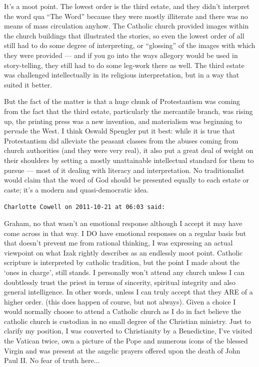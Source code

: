 \begin{footnotesize}
\begin{sffamily}
It's a moot point. The lowest order is the third estate, and they didn't interpret the word qua ``The Word'' because they were mostly illiterate and there was no means of mass circulation anyhow. The Catholic church provided images within the church buildings that illustrated the stories, so even the lowest order of all still had to do some degree of interpreting, or ``glossing'' of the images with which they were provided --- and if you go into the ways allegory would be used in story-telling, they still had to do some leg-work there as well. The third estate was challenged intellectually in its religious interpretation, but in a way that suited it better.

But the fact of the matter is that a huge chunk of Protestantism was coming from the fact that the third estate, particularly the mercantile branch, was rising up, the printing press was a new invention, and materialism was beginning to pervade the West. I think Oswald Spengler put it best: while it is true that Protestantism did alleviate the peasant classes from the abuses coming from church authorities (and they were very real), it also put a great deal of weight on their shoulders by setting a mostly unattainable intellectual standard for them to pursue --- most of it dealing with literacy and interpretation. No traditionalist would claim that the word of God should be presented equally to each estate or caste; it's a modern and quasi-democratic idea.

\hfill

\texttt{Charlotte Cowell on 2011-10-21 at 06:03 said:}

Graham, no that wasn't an emotional response although I accept it may have come across in that way. I DO have emotional responses on a regular basis but that doesn't prevent me from rational thinking, I was expressing an actual viewpoint on what Izak rightly describes as an endlessly moot point. Catholic scripture is interpreted by catholic tradition, but the point I made about the `ones in charge', still stands. I personally won't attend any church unless I can doubtlessly trust the priest in terms of sincerity, spiritual integrity and also general intelligence. In other words, unless I can truly accept that they ARE of a higher order. (this does happen of course, but not always). Given a choice I would normally choose to attend a Catholic church as I do in fact believe the catholic church is custodian in no small degree of the Christian ministry. Just to clarify my position, I was converted to Christianity by a Benedictine, I've visited the Vatican twice, own a picture of the Pope and numerous icons of the blessed Virgin and was present at the angelic prayers offered upon the death of John Paul II. No fear of truth here... \hfill


\end{sffamily}
\end{footnotesize}
